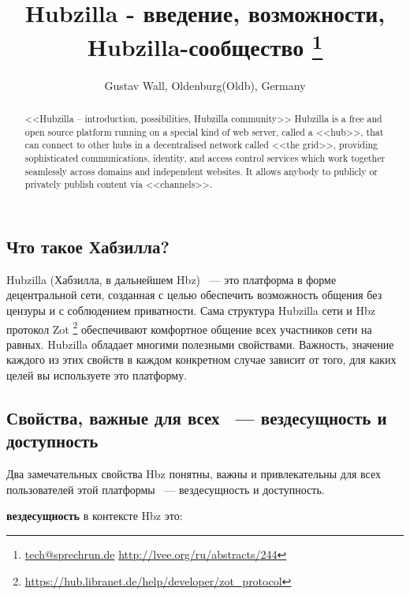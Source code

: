 \documentclass[10pt, a5paper]{article}
\begin{document}
\title{Hubzilla - введение, возможности, Hubzilla-сообщество \footnote{\url{tech@sprechrun.de} \url{http://lvee.org/ru/abstracts/244}}}
\author{Gustav Wall, Oldenburg(Oldb), Germany}
\maketitle
\begin{abstract}
<<Hubzilla – introduction, possibilities, Hubzilla community>>
Hubzilla is a free and open source platform running on a special kind of web server, called a <<hub>>, that can connect to other hubs in a decentralised network called <<the grid>>, providing sophisticated communications, identity, and access control services which work together seamlessly across domains and independent websites. It allows anybody to publicly or privately publish content via <<channels>>.
\end{abstract}
\subsection*{Что такое Хабзилла?}

  

Hubzilla (Хабзилла, в дальнейшем Hbz) ~--- это платформа в форме децентральной сети, созданная с целью обеспечить возможность общения без цензуры и с соблюдением приватности. Сама структура Hubzilla сети и Hbz протокол Zot \footnote{\url{https://hub.libranet.de/help/developer/zot_protocol}} обеспечивают комфортное общение всех участников сети на равных. Hubzilla обладает многими полезными свойствами. Важность, значение каждого из этих свойств в каждом конкретном случае зависит от того, для каких целей вы используете это платформу.

\subsection*{Свойства, важные для всех ~--- вездесущность и доступность}

Два замечательных свойства Hbz понятны, важны и привлекательны для всех пользователей этой платформы ~--- вездесущность и доступность.

\textbf{вездесущность} в контексте Hbz это:
\end{document}
